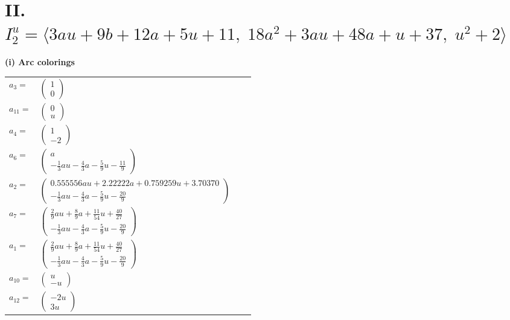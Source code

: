 \documentclass[1p]{elsarticle_modified}
\theoremstyle{definition}
\begin{document}
\centering \section*{II. $I^u_{2}= \langle 3 a u+9 b+12 a+5 u+11,\;18 a^2+3 a u+48 a+u+37,\;u^2+2 \rangle$}
\flushleft \textbf{(i) Arc colorings}\\
\begin{tabular}{m{7pt} m{180pt} m{7pt} m{180pt} }
\flushright $a_{3}=$&$\begin{pmatrix}1\\0\end{pmatrix}$ \\
\flushright $a_{11}=$&$\begin{pmatrix}0\\u\end{pmatrix}$ \\
\flushright $a_{4}=$&$\begin{pmatrix}1\\-2\end{pmatrix}$ \\
\flushright $a_{6}=$&$\begin{pmatrix}a\\-\frac{1}{3} a u-\frac{4}{3} a-\frac{5}{9} u-\frac{11}{9}\end{pmatrix}$ \\
\flushright $a_{2}=$&$\begin{pmatrix}0.555556 a u+2.22222 a+0.759259 u+3.70370\\-\frac{1}{3} a u-\frac{4}{3} a-\frac{5}{9} u-\frac{20}{9}\end{pmatrix}$ \\
\flushright $a_{7}=$&$\begin{pmatrix}\frac{2}{9} a u+\frac{8}{9} a+\frac{11}{54} u+\frac{40}{27}\\-\frac{1}{3} a u-\frac{4}{3} a-\frac{5}{9} u-\frac{20}{9}\end{pmatrix}$ \\
\flushright $a_{1}=$&$\begin{pmatrix}\frac{2}{9} a u+\frac{8}{9} a+\frac{11}{54} u+\frac{40}{27}\\-\frac{1}{3} a u-\frac{4}{3} a-\frac{5}{9} u-\frac{20}{9}\end{pmatrix}$ \\
\flushright $a_{10}=$&$\begin{pmatrix}u\\- u\end{pmatrix}$ \\
\flushright $a_{12}=$&$\begin{pmatrix}-2 u\\3 u\end{pmatrix}$ \\

\end{tabular}
\end{document}
